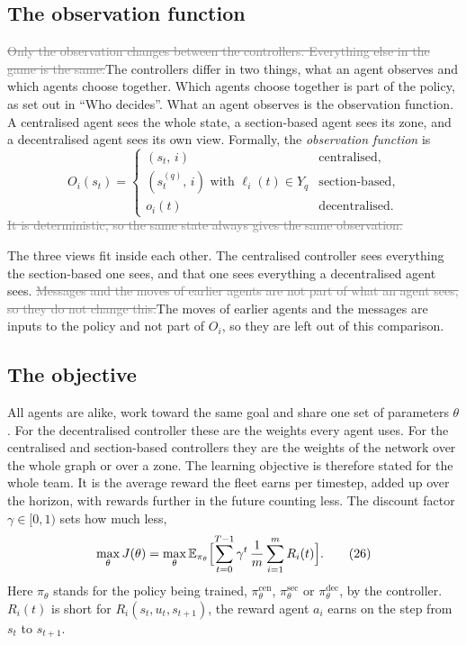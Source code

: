 \documentclass[11pt,a4paper]{article}
\newcommand{\new}[1]{\textcolor{newc}{#1}}
\newcommand{\old}[1]{\textcolor{gray}{\sout{#1}}}
\begin{document}
\subsection*{The observation function}
\old{Only the observation changes between the controllers. Everything else in
the game is the same.}\new{The controllers differ in two things, what an agent
observes and which agents choose together. Which agents choose together is
part of the policy, as set out in ``Who decides''. What an agent observes is
the observation function.} A centralised agent sees the whole state, a
section-based agent sees its zone, and a decentralised agent sees its own
view. Formally, the \emph{observation function} is
\[
  O_i(s_t) =
  \begin{cases}
    (s_t,\, i) & \text{centralised},\\
    (s^{(q)}_t,\, i) \text{ with } \ell_i(t) \in Y_q & \text{section-based},\\
    o_i(t) & \text{decentralised}.
  \end{cases} \tag{25}
\]
\old{It is deterministic, so the same state always gives the same
observation.}

The three views fit inside each other. The centralised controller sees
everything the section-based one sees, and that one sees everything a
decentralised agent sees. \old{Messages and the moves of earlier agents are
not part of what an agent sees, so they do not change this.}\new{The moves of
earlier agents and the messages are inputs to the policy and not part of
$O_i$, so they are left out of this comparison.}

\subsection*{The objective}
All agents are alike, work toward the same goal and share one set of
parameters $\theta$. \new{For the decentralised controller these are the
weights every agent uses. For the centralised and section-based controllers
they are the weights of the network over the whole graph or over a zone.} The
learning objective is therefore stated for the whole team. It is the average
reward the fleet earns per timestep, added up over the horizon, with rewards
further in the future counting less. The discount factor $\gamma \in [0,1)$
sets how much less,
\[
  \max_{\theta} J(\theta) = \max_{\theta} \mathbb{E}_{\pi_\theta}
  \Bigl[ \sum_{t=0}^{T-1} \gamma^{t}\, \frac{1}{m} \sum_{i=1}^{m} R_i(t)
  \Bigr]. \tag{26}
\]
Here $\pi_\theta$ stands for the policy being trained,
$\pi^{\mathrm{cen}}_\theta$, $\pi^{\mathrm{sec}}_\theta$ or
$\pi^{\mathrm{dec}}_\theta$, by the controller. $R_i(t)$ is short for
$R_i(s_t, u_t, s_{t+1})$, the reward agent $a_i$ earns on the step from $s_t$
to $s_{t+1}$.
\end{document}
